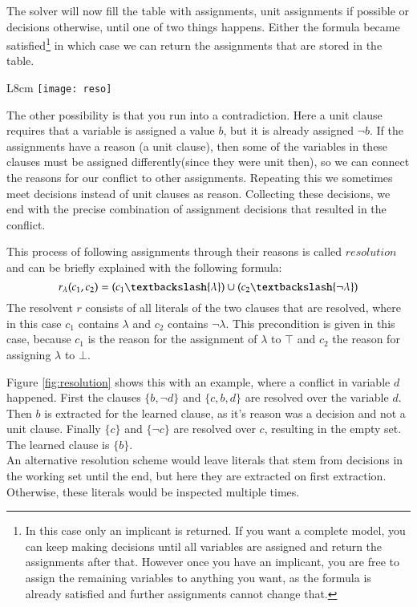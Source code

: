 The solver will now fill the table with assignments, unit assignments if possible or decisions otherwise, until one of two things happens. Either the formula became satisfied\footnote{
	In this case only an implicant is returned. If you want a complete model, you can keep making decisions until all variables are assigned and return the assignments after that. However once you have an implicant, you are free to assign the remaining variables to anything you want, as the formula is already satisfied and further assignments cannot change that.}
 in which case we can return the assignments that are stored in the table.

\begin{wrapfigure}{L}{8cm}
\texttt{[image: reso]}
\caption{Example of a resolution. Shown is a formula, the content of the CDCL table at the point of conflict in variable $d$ and the resolution graph.}
\label{fig:resolution}
\end{wrapfigure}

The other possibility is that you run into a contradiction. Here a unit clause requires that a variable is assigned a value $b$, but it is already assigned $\neg b$. If the assignments have a reason (a unit clause), then some of the variables in these clauses must be assigned differently(since they were unit then), so we can connect the reasons for our conflict to other assignments. Repeating this we sometimes meet decisions instead of unit clauses as reason. Collecting these decisions, we end with the precise combination of assignment decisions that resulted in the conflict. 


This process of following assignments through their reasons is called $resolution$ and can be briefly explained with the following formula:
$$
r_\lambda(c_1,c_2) = (c_1 \textbackslash \{\lambda\}) \cup (c_2 \textbackslash \{\neg \lambda\})
$$
The resolvent $r$ consists of all literals of the two clauses that are resolved, where in this case $c_1$ contains $\lambda$ and $c_2$ contains $\neg \lambda$. This precondition is given in this case, because $c_1$ is the reason for the assignment of $\lambda$ to $\top$ and $c_2$ the reason for assigning $\lambda$ to $\bot$. 

Figure \ref{fig:resolution} shows this with an example, where a conflict in variable $d$ happened. First the clauses $\{b,\neg d\}$ and $\{c,b,d\}$ are resolved over the variable $d$. Then $b$ is extracted for the learned clause, as it's reason was a decision and not a unit clause. Finally $\{c\}$ and $\{\neg c\}$ are resolved over $c$, resulting in the empty set. The learned clause is $\{b\}$.\\
An alternative resolution scheme would leave literals that stem from decisions in the working set until the end, but here they are extracted on first extraction. Otherwise, these literals would be inspected multiple times.


